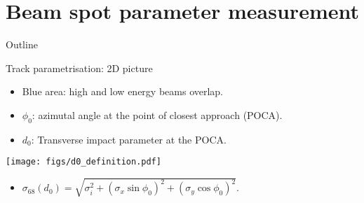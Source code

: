 \section{Beam spot parameter measurement}
\begin{frame}{Outline}
\end{frame}
\begin{frame}{Track parametrisation: 2D picture}
\begin{itemize}
\item {\color{cyan}Blue area}: high and low energy beams overlap.
\vspace{0.2cm}
\item $\phi_0$: azimutal angle at the point of closest approach (POCA).
\vspace{0.2cm}
\item $d_0$: Transverse impact parameter at the POCA.
\vspace{0.2cm}
\end{itemize}
\centering
\texttt{[image: figs/d0\_definition.pdf]}
\begin{itemize}
\vspace{0.25cm}
\begin{itemize}
\item $\sigma_{68}(d_0)=\sqrt{\sigma_i^2+(\sigma_x\sin\phi_0)^2+(\sigma_y\cos\phi_0)^2}$.
\vspace{1.0cm}
\end{itemize}
\end{itemize}
\end{frame}
